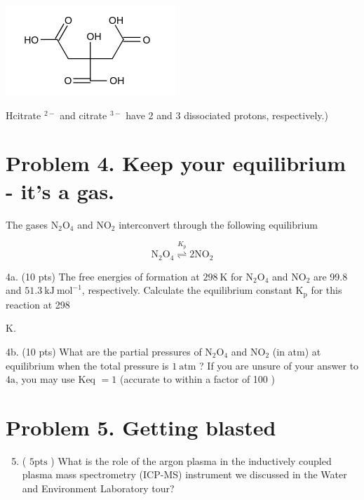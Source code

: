 \documentclass[12pt]{article}
\begin{document}
\includegraphics{smile-lvslvvf9smi5kvdw2w.png}


Hcitrate ${ }^{2-}$ and citrate ${ }^{3-}$ have 2 and 3 dissociated protons, respectively.)

\section*{Problem 4. Keep your equilibrium - it's a gas.}
The gases $\mathrm{N}_{2} \mathrm{O}_{4}$ and $\mathrm{NO}_{2}$ interconvert through the following equilibrium

$$
\mathrm{N}_{2} \mathrm{O}_{4} \stackrel{K_{p}}{\rightleftharpoons} 2 \mathrm{NO}_{2}
$$

4a. (10 pts) The free energies of formation at $298 \mathrm{~K}$ for $\mathrm{N}_{2} \mathrm{O}_{4}$ and $\mathrm{NO}_{2}$ are 99.8 and $51.3 \mathrm{~kJ} \mathrm{~mol}^{-1}$, respectively. Calculate the equilibrium constant $\mathrm{K}_{\mathrm{p}}$ for this reaction at 298

K.

4b. (10 pts) What are the partial pressures of $\mathrm{N}_{2} \mathrm{O}_{4}$ and $\mathrm{NO}_{2}$ (in atm) at equilibrium when the total pressure is $1 \mathrm{~atm}$ ? If you are unsure of your answer to $4 \mathrm{a}$, you may use Keq $=1$ (accurate to within a factor of 100 )

\section*{Problem 5. Getting blasted}
\begin{enumerate}
  \setcounter{enumi}{4}
  \item ( $5 \mathrm{pts}$ ) What is the role of the argon plasma in the inductively coupled plasma mass spectrometry (ICP-MS) instrument we discussed in the Water and Environment Laboratory tour?
\end{enumerate}
\end{document}
